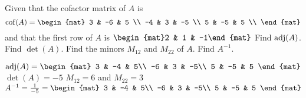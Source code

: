 
\begin{Exercise}[
name={},
title={}, 
difficulty=0,
origin={\cite{MB}}]
Given that the cofactor matrix of $A$ is
\[
\cof(A)=
\begin{mat}
  3 & -6 & 5 \\
  -4 & 3 & -5 \\
  5 & -5 & 5 \\
\end{mat}
\] and that the first row of $A$ is $\begin{mat}2 & 1 & -1\end{mat}$
\Question Find $\operatorname{adj}(A)$.
\Question Find $\det(A)$.
\Question Find the minors $M_{12}$ and $M_{22}$ of $A$.
\Question Find $A^{-1}$.
\end{Exercise}

\begin{Answer}
\begin{multicols}{2}
\Question $\adj(A) =
\begin{mat}
3 & -4 & 5\\
-6 & 3 & -5\\
5 & -5 & 5
\end{mat}$
\Question $\det(A) = -5$
\Question $M_{12}=6$ and $M_{22}=3$
\Question $A^{-1}=\frac{1}{-5}=
\begin{mat}
3 & -4 & 5\\
-6 & 3 & -5\\
5 & -5 & 5
\end{mat}$
\EndCurrentQuestion
\end{multicols}
\end{Answer}
